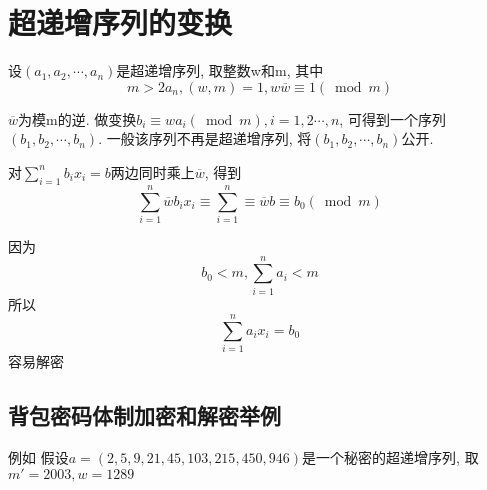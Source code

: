 \documentclass[UTF8]{ctexart}
\begin{document}
    \section{超递增序列的变换}
    设$(a_1, a_2, \cdots, a_n)$是超递增序列, 取整数w和m, 其中
    $$m>2a_n, (w, m)=1, w\overline{w}\equiv 1(\bmod m)$$

    $\overline{w}$为模m的逆. 做变换$b_i\equiv wa_i(\bmod m), i=1,2\cdots,n$, 可得到一个序列$(b_1, b_2, \cdots, b_n)$. 一般该序列不再是超递增序列, 将$(b_1, b_2, \cdots, b_n)$公开.

    对$\sum\limits_{i=1}^n b_ix_i=b$两边同时乘上$\overline{w}$, 得到
    $$\sum\limits_{i=1}^n \overline{w}b_ix_i\equiv \sum\limits_{i=1}^n\equiv \overline{w}b\equiv b_0(\bmod m)$$

    因为
    $$b_0<m, \sum\limits_{i=1}^n a_i <m$$
    所以
    $$\sum\limits_{i=1}^n a_ix_i=b_0$$
    容易解密

    \subsection{背包密码体制加密和解密举例}
    例如 假设$a=(2,5,9,21,45,103,215,450,946)$是一个秘密的超递增序列, 取$m'=2003, w=1289$
\end{document}
